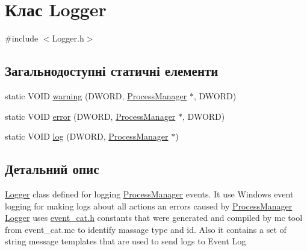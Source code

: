 \hypertarget{class_logger}{\section{Клас Logger}
\label{class_logger}
}


{\ttfamily \#include $<$Logger.\+h$>$}

\subsection*{Загальнодоступні статичні елементи}
\begin{DoxyCompactItemize}
\item 
static V\+O\+I\+D \hyperlink{class_logger_afe180eaa48c2d6092da54ef80a9a54c5}{warning} (D\+W\+O\+R\+D, \hyperlink{class_process_manager}{Process\+Manager} $\ast$, D\+W\+O\+R\+D)
\item 
static V\+O\+I\+D \hyperlink{class_logger_a4a18f512e2d977a9bcb98af5d56db1d1}{error} (D\+W\+O\+R\+D, \hyperlink{class_process_manager}{Process\+Manager} $\ast$, D\+W\+O\+R\+D)
\item 
static V\+O\+I\+D \hyperlink{class_logger_ae246b48011da71bcd9f734a367e7646e}{log} (D\+W\+O\+R\+D, \hyperlink{class_process_manager}{Process\+Manager} $\ast$)
\end{DoxyCompactItemize}


\subsection{Детальний опис}
\hyperlink{class_logger}{Logger} class defined for logging \hyperlink{class_process_manager}{Process\+Manager} events. It use Windows event logging for making logs about all actions an errors caused by \hyperlink{class_process_manager}{Process\+Manager} \hyperlink{class_logger}{Logger} uses \hyperlink{event__cat_8h_source}{event\+\_\+cat.\+h} constants that were generated and compiled by mc tool from event\+\_\+cat.\+mc to identify massage type and id. Also it contains a set of string message templates that are used to send logs to Event Log 

